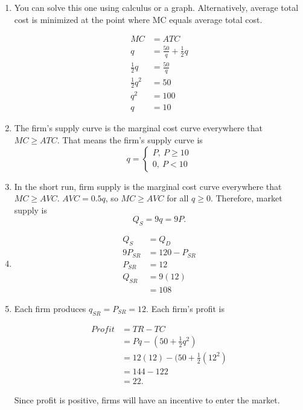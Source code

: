 \documentclass{article}
\begin{document}
\begin{enumerate}
\begin{enumerate}
	\item You can solve this one using calculus or a graph. Alternatively, average total cost is minimized at the point where MC equals average total cost.
	
	\begin{align*}
	MC &=ATC \\
	q &= \frac{50}{q} + \frac{1}{2}q \\
	\frac{1}{2}q &= \frac{50}{q} \\
	\frac{1}{2}q^2 &= 50 \\
	q^2 &= 100 \\
	q &= 10
	\end{align*}
	
	\item The firm's supply curve is the marginal cost curve everywhere that $MC \geq ATC$. That means the firm's supply curve is 
	\begin{equation*}
	q = \begin{cases}
	P, \ P \geq 10 \\
	0, \ P < 10
	\end{cases}
	\end{equation*}
	
	\item In the short run, firm supply is the marginal cost curve everywhere that $MC \geq AVC$. $AVC = 0.5q$, so $MC \geq AVC$ for all $q \geq 0$. Therefore, market supply is \[ Q_S = 9q = 9P. \]
	
	\item \begin{align*}
	Q_S &= Q_D \\
	9P_{SR} &= 120 - P_{SR} \\
	P_{SR} &= 12 \\
	Q_{SR} &= 9(12) \\
	&= 108
	\end{align*}
	
	\item Each firm produces $q_{SR} = P_{SR} = 12$. Each firm's profit is
	
		\begin{align*}
		Profit &= TR - TC \\
		&= Pq - (50 + \frac{1}{2}q^2) \\
		&= 12(12) - (50 + \frac{1}{2}(12^2) \\
		&= 144 - 122 \\
		&= 22.
		\end{align*}
		
		Since profit is positive, firms will have an incentive to enter the market. 
		

\end{enumerate}
\end{enumerate}
\end{document}
